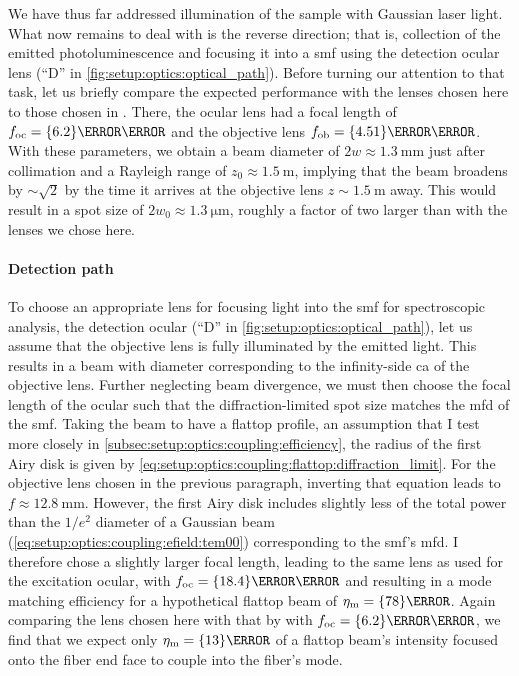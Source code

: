 We have thus far addressed illumination of the sample with Gaussian laser light.
What now remains to deal with is the reverse direction; that is, collection of the emitted photoluminescence and focusing it into a \gls{smf} using the detection ocular lens (\enquote{D} in \cref{fig:setup:optics:optical_path}).
Before turning our attention to that task, let us briefly compare the expected performance with the lenses chosen here to those chosen in .
There, the ocular lens had a focal length of $\foc = \qty{6.2}{\milli\meter}$ and the objective lens $\fob = \qty{4.51}{\milli\meter}$.
With these parameters, we obtain a beam diameter of $2w \approx\qty{1.3}{\milli\meter}$ just after collimation and a Rayleigh range of $z_0\approx\qty{1.5}{\meter}$, implying that the beam broadens by $\sim\sqrt{2}$ by the time it arrives at the objective lens $z\sim\qty{1.5}{\meter}$ away.
This would result in a spot size of $2 w_0\approx\qty{1.3}{\micro\meter}$, roughly a factor of two larger than with the lenses we chose here.

\paragraph{Detection path}\label{par:setup:optics:coupling:detection}
To choose an appropriate lens for focusing light into the \gls{smf} for spectroscopic analysis, the detection ocular (\enquote{D} in \cref{fig:setup:optics:optical_path}), let us assume that the objective lens is fully illuminated by the emitted light.
This results in a beam with diameter corresponding to the infinity-side \gls{ca} of the objective lens.
Further neglecting beam divergence, we must then choose the focal length of the ocular such that the diffraction-limited spot size matches the \gls{mfd} of the \gls{smf}.
Taking the beam to have a flattop profile, an assumption that I test more closely in \cref{subsec:setup:optics:coupling:efficiency}, the radius of the first Airy disk is given by \cref{eq:setup:optics:coupling:flattop:diffraction_limit}.
For the objective lens chosen in the previous paragraph, inverting that equation leads to $f\approx\qty{12.8}{\milli\meter}$.
However, the first Airy disk includes slightly less of the total power than the $1/e^2$ diameter of a Gaussian beam (\cf \cref{eq:setup:optics:coupling:efield:tem00}) corresponding to the \gls{smf}'s \gls{mfd}.
I therefore chose a slightly larger focal length, leading to the same lens as used for the excitation ocular, \ocularlens with $\foc = \qty{18.4}{\milli\meter}$ and resulting in a mode matching efficiency for a hypothetical flattop beam of $\eta_{\mr{m}} = \qty{78}{\percent}$.
Again comparing the lens chosen here with that by  with $\foc = \qty{6.2}{\milli\meter}$, we find that we expect only $\eta_{\mr{m}} = \qty{13}{\percent}$ of a flattop beam's intensity focused onto the fiber end face to couple into the fiber's  mode.

